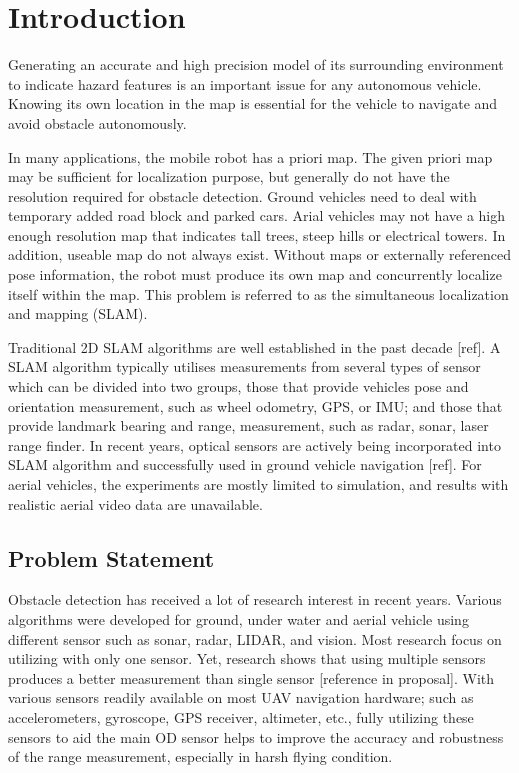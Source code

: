\chapter{Introduction} \label{ch:intro}

Generating an accurate and high precision model of its surrounding 
environment to indicate hazard features is an important issue for any 
autonomous vehicle. Knowing its own location in the map is essential for 
the vehicle to navigate and avoid obstacle autonomously. 

In many applications, the mobile robot has a priori map. The given 
priori map may be sufficient for localization purpose, but generally do 
not have the resolution required for obstacle detection. Ground vehicles 
need to deal with temporary added road block and parked cars. Arial 
vehicles may not have a high enough resolution map that indicates tall 
trees, steep hills or electrical towers. In addition, useable map do not 
always exist. Without maps or externally referenced pose information, 
the robot must produce its own map and concurrently localize itself 
within the map. This problem is referred to as the simultaneous 
localization and mapping (SLAM). 

Traditional 2D SLAM algorithms are well established in the past decade
[ref]. A SLAM algorithm typically utilises measurements from several
types of sensor which can be divided into two groups, those that
provide vehicles pose and orientation measurement, such as wheel
odometry, GPS, or IMU; and those that provide landmark bearing and
range, measurement, such as radar, sonar, laser range finder. In
recent years, optical sensors are actively being incorporated into
SLAM algorithm and successfully used in ground vehicle navigation
[ref]. For aerial vehicles, the experiments are mostly limited to
simulation, and results with realistic aerial video data are
unavailable.

\section{Problem Statement}\label{section:ProblemStatement}
Obstacle detection has received a lot of research interest in recent 
years. Various algorithms were developed for ground, under water and 
aerial vehicle using different sensor such as sonar, radar, LIDAR, and 
vision. Most research focus on utilizing with only one sensor. Yet, 
research shows that using multiple sensors produces a better measurement 
than single sensor [reference in proposal]. With various sensors 
readily available on most UAV navigation hardware; such as 
accelerometers, gyroscope, GPS receiver, altimeter, etc., fully 
utilizing these sensors to aid the main OD sensor helps to improve the 
accuracy and robustness of the range measurement, especially in harsh 
flying condition. 

